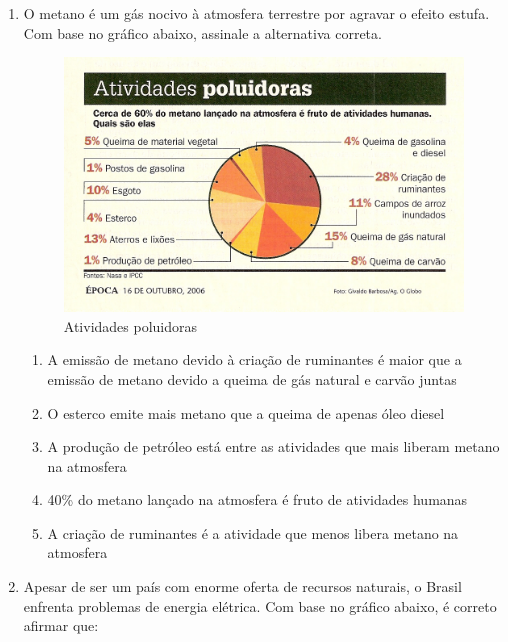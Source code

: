 \documentclass[10pt,a4paper]{article}
\begin{document}
\begin{multicols}{2}
\begin{enumerate}

	\item O metano é um gás nocivo à atmosfera terrestre por agravar o efeito estufa. Com base no gráfico abaixo, assinale a alternativa correta.

\begin{figure}
     \includegraphics[scale=0.1]{ozonio.jpg}
     \caption{Atividades poluidoras}
     \label{poluidoras}
\end{figure}


		\begin{enumerate}
		\item A emissão de metano devido à criação de ruminantes é maior que a emissão de metano devido a queima de gás natural e carvão juntas
		\item O esterco emite mais metano que a queima de apenas óleo diesel
		\item A produção de petróleo está entre as atividades que mais liberam metano na atmosfera
		\item 40\% do metano lançado na atmosfera é fruto de atividades humanas
		\item A criação de ruminantes é a atividade que menos libera metano na atmosfera
		\end{enumerate}

	\item Apesar de ser um país com enorme oferta de recursos naturais, o Brasil enfrenta problemas de energia elétrica. Com base no gráfico abaixo, é correto afirmar que:


\end{enumerate}
\end{multicols}
\end{document}
